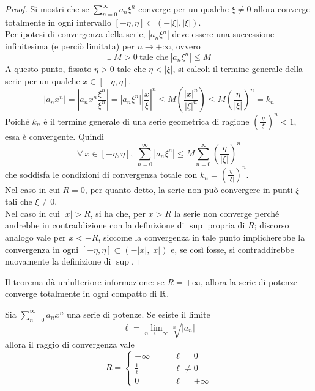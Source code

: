 \begin{proof}
 Si mostri che se $\sum\limits_{n=0}^{\infty}{a_n \xi^n}$ converge per un qualche $\xi \neq 0$ allora converge totalmente in ogni intervallo $[-\eta, \eta] \subset (-|\xi|, |\xi|)$.\\
 Per ipotesi di convergenza della serie, $|a_n \xi^n|$ deve essere una successione infinitesima (e perciò limitata) per $n\to +\infty$, ovvero
 \begin{equation*}
     \exists\ M>0\ \text{tale che}\ |a_n\xi^n|\leq M
 \end{equation*}
 A questo punto, fissato $\eta>0$ tale che $\eta<|\xi|$, si calcoli il termine generale della serie per un qualche $x \in [-\eta, \eta]$.
 \begin{equation*}
     |a_n x^n| = \left|a_n x^n \frac{\xi^n}{\xi^n}\right|=\left|a_n \xi^n\right| \left|\frac{x}{\xi}\right|^n \leq M \left(\frac{|x|^n}{\left|\xi\right|^n} \right)\leq M \left(\frac{\eta}{\left| \xi \right|} \right)^n =k_n
 \end{equation*}
 Poiché $k_n$ è il termine generale di una serie geometrica di ragione $\left(\tfrac{\eta}{\left| \xi \right|} \right)^n < 1$, essa è convergente. Quindi
 \begin{equation*}
 \forall\ x \in [-\eta, \eta],\ \sum\limits_{n=0}^{\infty}{|a_n \xi^n|} \leq M \sum_{n=0}^{\infty}{\left(\frac{\eta}{\left| \xi \right|} \right)^n}
 \end{equation*}
 che soddisfa le condizioni di convergenza totale con $k_n=\left(\tfrac{\eta}{\left| \xi \right|} \right)^n$.\\
 Nel caso in cui $R=0$, per quanto detto, la serie non può convergere in punti $\xi$ tali che $\xi \neq 0$.\\
 Nel caso in cui $|x|>R$, si ha che, per $x>R$ la serie non converge perché andrebbe in contraddizione con la definizione di $\sup$ propria di $R$; discorso analogo vale per $x<-R$, siccome la convergenza in tale punto implicherebbe la convergenza in ogni $[-\eta, \eta] \subset (-|x|, |x|)$ e, se così fosse, si contraddirebbe nuovamente la definizione di $\sup$.
\end{proof}
\begin{oss}
Il teorema dà un'ulteriore informazione: se $R= +\infty$, allora la serie di potenze converge totalmente in ogni compatto di $\mathbb{R}$.
\end{oss}
\begin{theorem} \label{Teo: Criterio di Cauchy-Hadamard}
Sia $\sum\limits_{n=0}^{\infty}{a_n x^n}$ una serie di potenze. Se esiste il limite
\begin{equation*}
    \ell=\lim_{n \to +\infty}{\sqrt[n]{|a_n|}}
\end{equation*}
    allora il raggio di convergenza vale
    \begin{equation*}
        R = \begin{cases}
            +\infty &\qquad \ell=0\\
            \frac{1}{\ell} &\qquad \ell \neq 0\\
            0 &\qquad \ell = +\infty
        \end{cases}
    \end{equation*}
\end{theorem}
